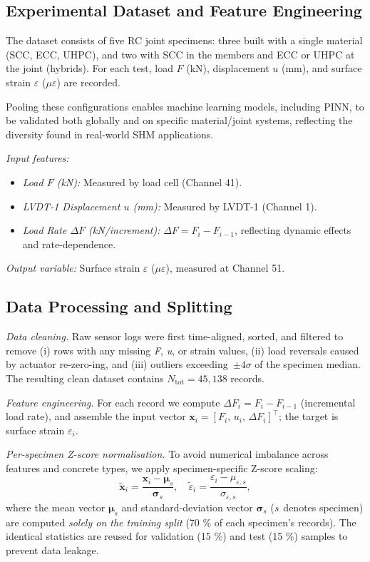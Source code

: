 \documentclass{article}
\begin{document}
\subsection{Experimental Dataset and Feature Engineering}
The dataset consists of five RC joint specimens: three built with a single material (SCC, ECC, UHPC), and two with SCC in the members and ECC or UHPC at the joint (hybrids). For each test, load $F$ (kN), displacement $u$ (mm), and surface strain $\varepsilon$ ($\mu\varepsilon$) are recorded.

Pooling these configurations enables machine learning models, including PINN, to be validated both globally and on specific material/joint systems, reflecting the diversity found in real-world SHM applications.

\emph{Input features:}
\begin{itemize}
    \item \emph{Load $F$ (kN):} Measured by load cell (Channel 41).
    \item \emph{LVDT-1 Displacement $u$ (mm):} Measured by LVDT-1 (Channel 1).
    \item \emph{Load Rate $\Delta F$ (kN/increment):} $\Delta F = F_i - F_{i-1}$, reflecting dynamic effects and rate-dependence.
\end{itemize}
\emph{Output variable:} Surface strain $\varepsilon$ ($\mu\varepsilon$), measured at Channel 51.

\subsection{Data Processing and Splitting}
\label{sec:dataprep}

\emph{Data cleaning.}  
Raw sensor logs were first time-aligned, sorted, and filtered to remove (i) rows with any missing
\emph{F}, \emph{u}, or strain values, (ii) load reversals caused by actuator re-zero­-ing, and
(iii) outliers exceeding~$\pm4\sigma$ of the specimen median.  The resulting clean dataset
contains $N_\mathrm{tot}=45{,}138$ records.


\smallskip
\emph{Feature engineering.}  
For each record we compute  
$\Delta F_i = F_i-F_{i-1}$ (incremental load rate),  
and assemble the input vector
$\mathbf{x}_i = [F_i,\,u_i,\,\Delta F_i]^\top$;  
the target is surface strain $\varepsilon_i$.

\smallskip
\emph{Per-specimen Z-score normalisation.}  
To avoid numerical imbalance across features and concrete types, we apply
specimen-specific Z-score scaling:
%
\begin{equation}
  \tilde{\mathbf{x}}_i =
  \frac{\mathbf{x}_i - \boldsymbol{\mu}_s}{\boldsymbol{\sigma}_s},
  \quad
  \tilde{\varepsilon}_i =
  \frac{\varepsilon_i - \mu_{\varepsilon,s}}{\sigma_{\varepsilon,s}},
  \label{eq:zscore}
\end{equation}
%
where the mean vector $\boldsymbol{\mu}_s$ and standard-deviation vector
$\boldsymbol{\sigma}_s$ (\emph{s}~denotes specimen) are computed
\emph{solely on the training split} (70 \% of each specimen’s records).  
The identical statistics are reused for validation (15 \%) and test (15 \%)
samples to prevent data leakage.
\end{document}
